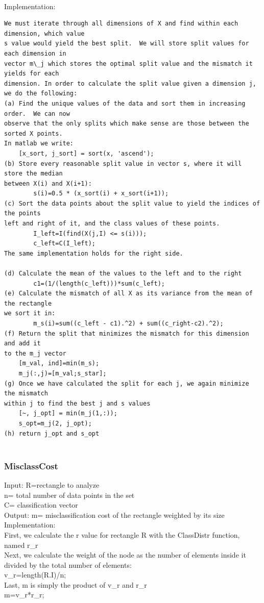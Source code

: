 \documentclass{article}
\begin{document}
\\Implementation:
\begin{verbatim}
We must iterate through all dimensions of X and find within each dimension, which value 
s value would yield the best split.  We will store split values for each dimension in 
vector m\_j which stores the optimal split value and the mismatch it yields for each 
dimension. In order to calculate the split value given a dimension j, we do the following:
(a) Find the unique values of the data and sort them in increasing order.  We can now 
observe that the only splits which make sense are those between the sorted X points.  
In matlab we write:
    [x_sort, j_sort] = sort(x, 'ascend');
(b) Store every reasonable split value in vector s, where it will store the median 
between X(i) and X(i+1): 
        s(i)=0.5 * (x_sort(i) + x_sort(i+1));
(c) Sort the data points about the split value to yield the indices of the points 
left and right of it, and the class values of these points. 
        I_left=I(find(X(j,I) <= s(i)));
        c_left=C(I_left);
The same implementation holds for the right side.

(d) Calculate the mean of the values to the left and to the right
        c1=(1/(length(c_left)))*sum(c_left);  
(e) Calculate the mismatch of all X as its variance from the mean of the rectangle 
we sort it in:
        m_s(i)=sum((c_left - c1).^2) + sum((c_right-c2).^2);
(f) Return the split that minimizes the mismatch for this dimension and add it 
to the m_j vector
    [m_val, ind]=min(m_s);
    m_j(:,j)=[m_val;s_star];
(g) Once we have calculated the split for each j, we again minimize the mismatch 
within j to find the best j and s values
    [~, j_opt] = min(m_j(1,:));
    s_opt=m_j(2, j_opt);
(h) return j_opt and s_opt


\end{verbatim}
\subsubsection*{MisclassCost}
Input:  R=rectangle to analyze\\
        n= total number of data points in the set\\
        C= classification vector\\
Output: m= misclassification cost of the rectangle weighted by its size\\
Implementation: \\
First, we calculate the r value for rectangle R with the ClassDistr function, named r\_r\\
Next, we calculate the weight of the node as the number of elements inside it divided by the total number of elements:\\
    v\_r=length(R.I)/n;\\
Last, m is simply the product of v\_r and r\_r\\
m=v\_r*r\_r;\\
\end{document}
